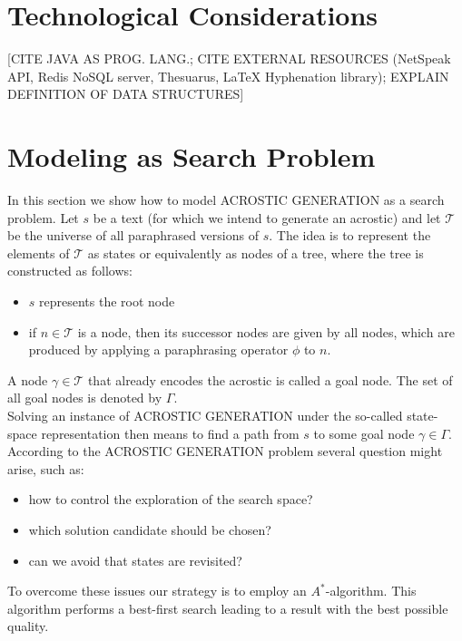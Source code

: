 \documentclass[11pt]{reportAlternative}
\begin{document}
\section{Technological Considerations}
[CITE JAVA AS PROG. LANG.; CITE EXTERNAL RESOURCES (NetSpeak API, Redis NoSQL server, Thesuarus, LaTeX Hyphenation library); EXPLAIN DEFINITION OF DATA STRUCTURES]

\section{Modeling as Search Problem}
In this section we show how to model ACROSTIC GENERATION as a search problem. Let $s$ be a text (for which we intend to generate an acrostic) and let $\mathcal{T}$ be the universe of all paraphrased versions of $s$. The idea is to represent the elements of $\mathcal{T}$ as states or equivalently as nodes of a tree, where the tree is constructed as follows:
\begin{itemize}
\item $s$ represents the root node

\item if $n\in\mathcal{T}$ is a node, then its successor nodes are given by all nodes, which
are produced by applying a paraphrasing operator $\phi$ to $n$.

\end{itemize}

A node $\gamma\in\mathcal{T}$ that already encodes the acrostic is called a goal node. The set of all goal nodes is denoted by $\Gamma$.\\
Solving an instance of ACROSTIC GENERATION under the so-called state-space representation then means to find a path from $s$ to some goal node $\gamma\in\Gamma$. According to the 
ACROSTIC GENERATION problem several question might arise, such as:

\begin{itemize}

\item  how to control the exploration of the search space?

\item which solution candidate should be chosen?

\item can we avoid that states are revisited?

\end{itemize}

To overcome these issues our strategy is to employ an $A^*$-algorithm. This algorithm performs a best-first search leading to a result with the best possible quality.  
\end{document}

